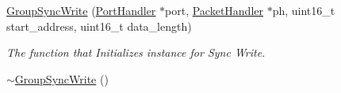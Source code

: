 \begin{DoxyCompactItemize}
\item 
\hyperlink{classmercury_1_1_group_sync_write_ae11458dfefdf9f9a172c5eb9746e7e8a}{Group\+Sync\+Write} (\hyperlink{classmercury_1_1_port_handler}{Port\+Handler} $\ast$port, \hyperlink{classmercury_1_1_packet_handler}{Packet\+Handler} $\ast$ph, uint16\+\_\+t start\+\_\+address, uint16\+\_\+t data\+\_\+length)
\begin{DoxyCompactList}\small\item\em The function that Initializes instance for Sync Write. \end{DoxyCompactList}\item 
\hyperlink{classmercury_1_1_group_sync_write_af1f453f4d1667a67021f80fd516a83e6}{$\sim$\+Group\+Sync\+Write} ()\hypertarget{classmercury_1_1_group_sync_write_af1f453f4d1667a67021f80fd516a83e6}{}\label{classmercury_1_1_group_sync_write_af1f453f4d1667a67021f80fd516a83e6}


\end{DoxyCompactItemize}
